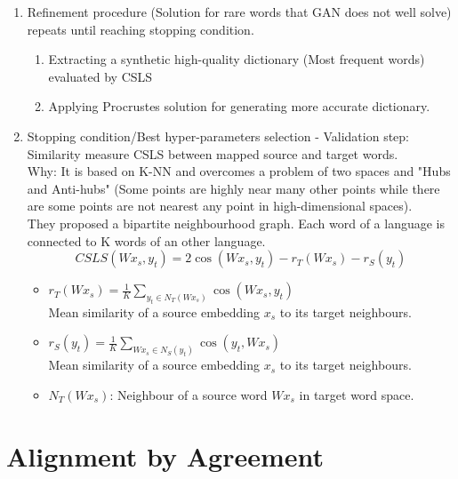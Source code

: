 \documentclass{article}
\begin{document}
\begin{enumerate}
\begin{itemize}
	
	\end{itemize}
\item Refinement procedure (Solution for rare words that GAN does not well solve) repeats until reaching stopping condition.
	\begin{enumerate}
	\item Extracting a synthetic high-quality dictionary (Most frequent words) evaluated by CSLS
	\item Applying Procrustes solution for generating more accurate dictionary.
	\end{enumerate}
\item Stopping condition/Best hyper-parameters selection - Validation step: Similarity measure CSLS between mapped source and target words.\\
	Why: It is based on K-NN and overcomes a problem of two spaces and "Hubs and Anti-hubs" (Some points are highly near many other points while there are some points are not nearest any point in high-dimensional spaces).\\
	They proposed a bipartite neighbourhood graph. Each word of a language is connected to K words of an other language.
	\begin{equation}
	CSLS(Wx_{s}, y_{t}) = 2 \cos(Wx_{s}, y_{t}) - r_{T}(Wx_{s}) - r_{S}(y_{t})
	\end{equation}
		\begin{itemize}
		\item $r_{T}(Wx_{s}) = \frac{1}{K} \sum_{y_{t} \in N_{T}(Wx_{s})} \cos(Wx_{s}, y_{t})$\\
		Mean similarity of a source embedding $x_{s}$ to its target neighbours.
		\item $r_{S}(y_{t}) = \frac{1}{K} \sum_{Wx_{s} \in N_{S}(y_{t})} \cos(y_{t}, Wx_{s})$\\
		Mean similarity of a source embedding $x_{s}$ to its target neighbours.
		\item $N_{T}(Wx_{s})$: Neighbour of a source word $Wx_{s}$ in target word space.
		\end{itemize}

\end{enumerate}

\section{Alignment by Agreement \citep{Liang2006Alignment}}
\end{document}
